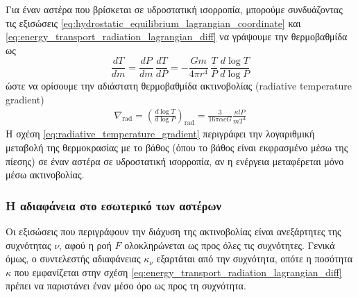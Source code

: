 Για έναν αστέρα που βρίσκεται σε υδροστατική ισορροπία, μπορούμε συνδυάζοντας τις εξισώσεις \eqref{eq:hydrostatic_equilibrium_lagrangian_coordinate} και \eqref{eq:energy_transport_radiation_lagrangian_diff} να γράψουμε την θερμοβαθμίδα ως
\begin{equation*}
    \frac{dT}{dm} = \frac{dP}{dm} \,\frac{dT}{dP} = - \frac{Gm}{4\pi r^4} \,\frac{T}{P} \,\frac{d\log T}{d\log P}
\end{equation*}
ώστε να ορίσουμε την αδιάστατη θερμοβαθμίδα ακτινοβολίας (radiative temperature gradient)
\begin{eqnarray}
    \label{eq:radiative_temperature_gradient}
    \nabla_{\text{rad}} = \left(\frac{d\log T}{d\log P} \right)_{\text{rad}} = \frac{3}{16\pi \alpha c G} \frac{\kappa l P}{m T^4}
\end{eqnarray}
Η σχέση \eqref{eq:radiative_temperature_gradient} περιγράφει την λογαριθμική μεταβολή της θερμοκρασίας με το βάθος (όπου το βάθος είναι εκφρασμένο μέσω της πίεσης) σε έναν αστέρα σε υδροστατική ισορροπία, αν η ενέργεια μεταφέρεται μόνο μέσω ακτινοβολίας.
\subsubsection{Η αδιαφάνεια στο εσωτερικό των αστέρων}
Οι εξισώσεις που περιγράφουν την διάχυση της ακτινοβολίας είναι ανεξάρτητες της συχνότητας $\nu$, αφού η ροή $F$ ολοκληρώνεται ως προς όλες τις συχνότητες. Γενικά όμως, ο συντελεστής αδιαφάνειας $\kappa_\nu$ εξαρτάται από την συχνότητα, οπότε η ποσότητα $\kappa$ που εμφανίζεται στην σχέση \eqref{eq:energy_transport_radiation_lagrangian_diff}
πρέπει να παριστάνει έναν μέσο όρο ως προς τη συχνότητα.

